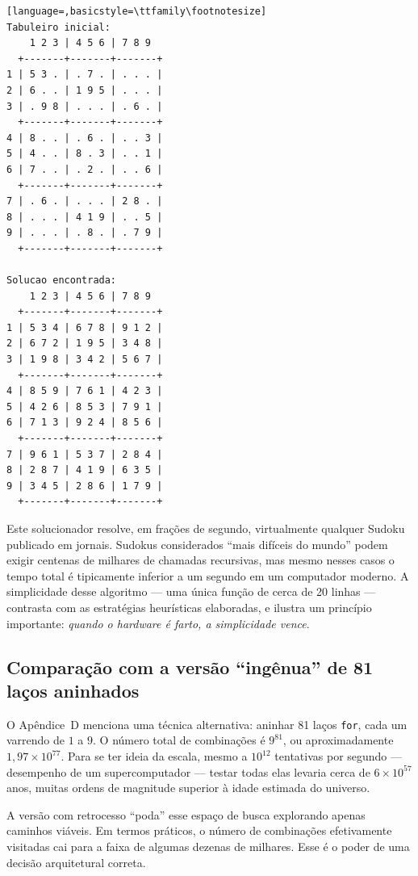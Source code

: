 \documentclass[11pt,a4paper,oneside]{report}
\newcommand{\codigo}[1]{\texttt{\color{deitelblue}#1}}
\begin{document}
\begin{lstlisting}[language=,basicstyle=\ttfamily\footnotesize]
Tabuleiro inicial:
    1 2 3 | 4 5 6 | 7 8 9
  +-------+-------+-------+
1 | 5 3 . | . 7 . | . . . |
2 | 6 . . | 1 9 5 | . . . |
3 | . 9 8 | . . . | . 6 . |
  +-------+-------+-------+
4 | 8 . . | . 6 . | . . 3 |
5 | 4 . . | 8 . 3 | . . 1 |
6 | 7 . . | . 2 . | . . 6 |
  +-------+-------+-------+
7 | . 6 . | . . . | 2 8 . |
8 | . . . | 4 1 9 | . . 5 |
9 | . . . | . 8 . | . 7 9 |
  +-------+-------+-------+

Solucao encontrada:
    1 2 3 | 4 5 6 | 7 8 9
  +-------+-------+-------+
1 | 5 3 4 | 6 7 8 | 9 1 2 |
2 | 6 7 2 | 1 9 5 | 3 4 8 |
3 | 1 9 8 | 3 4 2 | 5 6 7 |
  +-------+-------+-------+
4 | 8 5 9 | 7 6 1 | 4 2 3 |
5 | 4 2 6 | 8 5 3 | 7 9 1 |
6 | 7 1 3 | 9 2 4 | 8 5 6 |
  +-------+-------+-------+
7 | 9 6 1 | 5 3 7 | 2 8 4 |
8 | 2 8 7 | 4 1 9 | 6 3 5 |
9 | 3 4 5 | 2 8 6 | 1 7 9 |
  +-------+-------+-------+
\end{lstlisting}

\begin{desempenho}
Este solucionador resolve, em frações de segundo, virtualmente qualquer
Sudoku publicado em jornais. Sudokus considerados ``mais difíceis do mundo''
podem exigir centenas de milhares de chamadas recursivas, mas mesmo nesses
casos o tempo total é tipicamente inferior a um segundo em um computador
moderno. A simplicidade desse algoritmo --- uma única função de cerca de
20 linhas --- contrasta com as estratégias heurísticas elaboradas, e
ilustra um princípio importante: \emph{quando o hardware é farto, a
simplicidade vence}.
\end{desempenho}

\subsection{Comparação com a versão ``ingênua'' de 81 laços aninhados}

O Apêndice~D menciona uma técnica alternativa: aninhar 81 laços \codigo{for},
cada um varrendo de $1$ a $9$. O número total de combinações é $9^{81}$,
ou aproximadamente $1{,}97 \times 10^{77}$. Para se ter ideia da escala,
mesmo a $10^{12}$ tentativas por segundo --- desempenho de um
supercomputador --- testar todas elas levaria cerca de $6 \times 10^{57}$
anos, muitas ordens de magnitude superior à idade estimada do universo.

A versão com retrocesso ``poda'' esse espaço de busca explorando apenas
caminhos viáveis. Em termos práticos, o número de combinações efetivamente
visitadas cai para a faixa de algumas dezenas de milhares. Esse é o poder
de uma decisão arquitetural correta.
\end{document}
